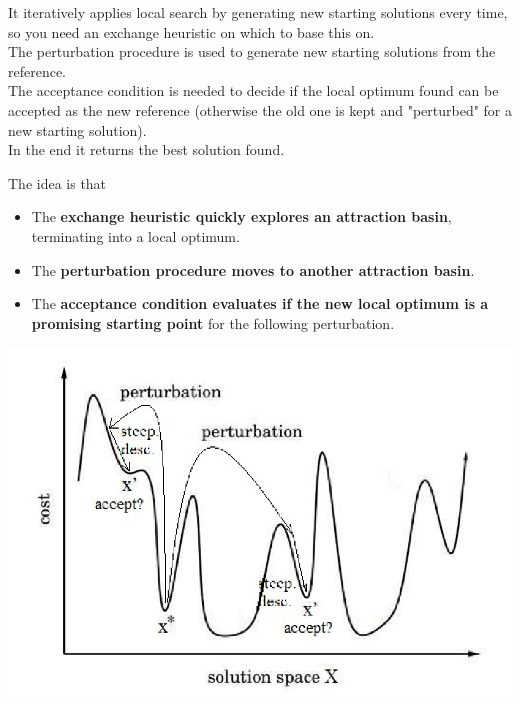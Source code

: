 It iteratively applies local search by generating new starting solutions every time, so you need an exchange heuristic on which to base this on.\\

The perturbation procedure is used to generate new starting solutions from the reference.\\

The acceptance condition is needed to decide if the local optimum found can be accepted as the new reference (otherwise the old one is kept and "perturbed" for a new starting solution).\\

In the end it returns the best solution found.

\newpage

The idea is that
\begin{itemize}
	\item The \textbf{exchange heuristic quickly explores an attraction basin}, terminating into a local optimum.
	
	\item The \textbf{perturbation procedure moves to another attraction basin}.
	
	\item The \textbf{acceptance condition evaluates if the new local optimum is a promising starting point} for the following perturbation.
\end{itemize}

\begin{center}
	\includegraphics[width=0.7\columnwidth]{img/ILS1}
\end{center}

\vfill

